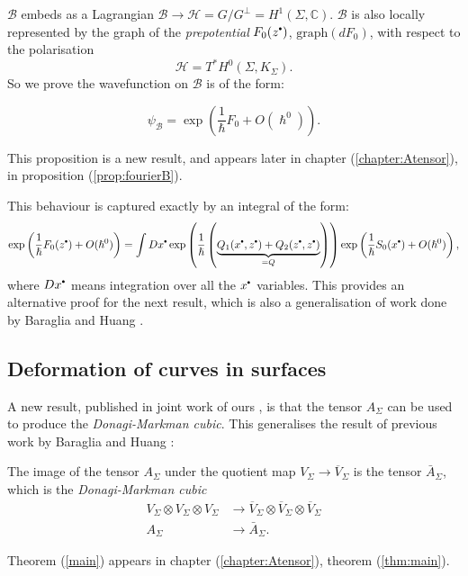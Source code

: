     \( \mathcal{B}\) embeds as a Lagrangian \(\mathcal{B} \rightarrow \mathcal{H} =G/G^{\perp} = H^1(\Sigma, \mathbb{C})\). \(\mathcal{B}\) is also locally represented by the graph of the \emph{prepotential} \( F_0(z^{\sbt})\), \( \mathrm{graph}(d F_0)\), with respect to the polarisation 
    \[ \mathcal{H} = T^* H^0( \Sigma, K_\Sigma ). \]
    So we prove the wavefunction on \( \mathcal{B}\) is of the form:
    \begin{prop}
    \begin{equation} 
    \psi_{\mathcal{B}} = \exp\left( \frac{1}{\hslash} F_0 + O(\hslash^0) \right).
    \end{equation}
    \end{prop}
    This proposition is a new result, and appears later in chapter (\ref{chapter:Atensor}), in proposition (\ref{prop:fourierB}).
    
    This behaviour is captured exactly by an integral of the form:
    \[ \exp\left( \frac{1}{\hslash} F_0(z^{\sbt}) + O(\hslash^0) \right) = \int Dx^{\sbt} \exp\left( \frac{1}{\hslash} \left( \underbrace{Q_1(x^{\sbt},z^{\sbt}) + Q_2(z^{\sbt},z^{\sbt})}_{=Q}\right)\right) \exp\left( \frac{1}{\hslash} S_0(x^{\sbt}) + O(\hslash^0)\right),\]
    where \( Dx^{\sbt}\) means integration over all the \(x^{\sbt}\) variables. This provides an alternative proof for the next result, which is also a generalisation of work done by Baraglia and Huang \cite{bhuespe}.

    \subsection{Deformation of curves in surfaces}

    
    A new result, published in joint work of ours \cite{chaimanowong2020airy}, is that the tensor \(A_\Sigma\) can be used to produce the \emph{Donagi-Markman cubic}. This generalises the result of previous work by Baraglia and Huang \cite{bhuespe}:

    \begin{thm}  \label{main}
    The image of the tensor \(A_\Sigma\) under the quotient map \(V_\Sigma \rightarrow \overline{V}_\Sigma\) is the tensor \(\bar{A}_\Sigma\), which is the \emph{Donagi-Markman cubic}
    \begin{align}  \label{tensquot}
        V_\Sigma\otimes V_\Sigma\otimes V_\Sigma& \longrightarrow\overline{V}_\Sigma\otimes\overline{V}_\Sigma\otimes\overline{V}_\Sigma\\
    A_\Sigma& \longrightarrow \bar{A}_\Sigma.\nonumber
    \end{align}
    \end{thm}
    Theorem (\ref{main}) appears in chapter (\ref{chapter:Atensor}), theorem (\ref{thm:main}).
    
